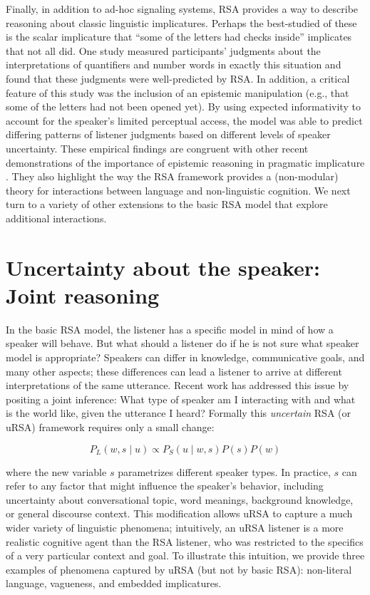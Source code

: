 \documentclass[]{elsarticle}
\begin{document}
Finally, in addition to ad-hoc signaling systems, RSA provides a way to describe reasoning about classic linguistic
implicatures. Perhaps the
best-studied of these is the scalar implicature that ``some of the
letters had checks inside'' implicates that not all did. 
One study \citep{goodman2013} measured participants' judgments about the
interpretations of quantifiers and number words in exactly this
situation and found that these judgments were well-predicted by RSA. In
addition, a critical feature of this study was the inclusion of an
epistemic manipulation (e.g., that some of the letters had not been opened
yet). By using expected informativity to account for the speaker's
limited perceptual access, the model was able to predict
differing patterns of listener judgments based on different levels of
speaker uncertainty. These empirical findings are congruent with other recent
demonstrations of the importance of epistemic reasoning in pragmatic
implicature \citep[e.g.,]{bergen2012,breheny2013}. They
also highlight the way the RSA framework provides a (non-modular) theory
for interactions between language and non-linguistic cognition.
We next turn to a variety of other extensions to the basic RSA model that explore additional interactions.

\section{Uncertainty about the speaker: Joint reasoning}\label{uncertainty-about-the-speaker-joint-reasoning}

In the basic RSA model, the listener has a specific model in mind of how
a speaker will behave. But what should a listener do if he is not sure
what speaker model is appropriate? Speakers can differ in knowledge, communicative goals, and many other aspects; 
these differences can lead a listener to arrive at different interpretations of the same utterance.
Recent work has addressed this issue by positing a joint inference: What type of speaker am I
interacting with and what is the world like, given the utterance I
heard? Formally this \emph{uncertain} RSA (or uRSA) framework requires
only a small change:

$$P_L(w,s\mid u) \propto
P_S(u\mid w,s)P(s)P(w)$$

where the new variable $s$ parametrizes different speaker types. In practice, $s$ can
refer to any factor that might influence the speaker's behavior,
including uncertainty about conversational topic, word
meanings, background knowledge, or general discourse context.
This modification allows uRSA to capture a much wider variety of
linguistic phenomena; intuitively, an uRSA listener is a more realistic
cognitive agent than the RSA listener, who was restricted to the
specifics of a very particular context and goal. To illustrate this
intuition, we provide three examples of phenomena captured by uRSA (but not by basic RSA): non-literal language, vagueness, and embedded implicatures.
\end{document}
